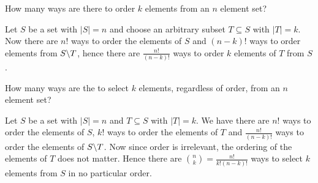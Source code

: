 \begin{problem}
    How many ways are there to order $k$ elements from an $n$ element set? 		
\end{problem}
\begin{solution}
    Let $S$ be a set with  $|S|=n$ and choose an arbitrary subset  $T \subseteq S$ with  $|T|=k$. Now
    there are $n!$ ways to order the elements of $S$ and  $(n-k)!$ ways to order elements
    from $S\backslash T$, hence there are $\frac{n!}{(n-k)!}$ ways to order $k$ elements of  $T$ from
     $S$.
\end{solution}

\begin{problem}
    How many ways are the to select $k$ elements, regardless of order, from an  $n$ element set?
\end{problem} 
\begin{solution}
    Let $S$ be a set with $|S|=n$ and $T \subseteq S$ with $|T|=k$. We have there are  $n!$ ways to
    order the elements of  $S$,  $k!$ ways to order the elements of  $T$ and  $\frac{n!}{(n-k)!}$ 
    ways to order the elements of $S\backslash T$. Now since order is irrelevant, the ordering of
    the elements of $T$ does not matter. Hence there are  $\binom{n}{k}=\frac{n!}{k!(n-k)!}$ ways
    to select $k$ elements from  $S$ in no particular order.
\end{solution}
